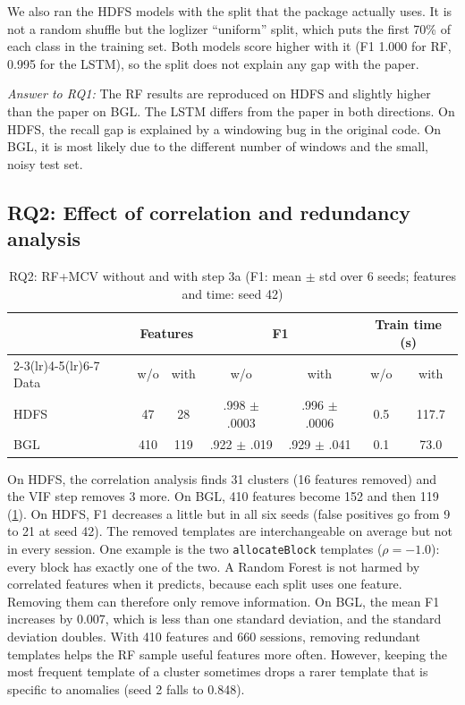 \documentclass[10pt, conference]{IEEEtran}
\newcommand{\tpl}[1]{\texttt{\small #1}}
\begin{document}
We also ran the HDFS models with the split that the package actually uses. It is not a random shuffle but the loglizer ``uniform'' split, which puts the first 70\% of each class in the training set. Both models score higher with it (F1 1.000 for RF, 0.995 for the LSTM), so the split does not explain any gap with the paper.

\textit{Answer to RQ1:} The RF results are reproduced on HDFS and slightly higher than the paper on BGL. The LSTM differs from the paper in both directions. On HDFS, the recall gap is explained by a windowing bug in the original code. On BGL, it is most likely due to the different number of windows and the small, noisy test set.

\subsection{RQ2: Effect of correlation and redundancy analysis}

\begin{table}[t]
\centering
\caption{RQ2: RF+MCV without and with step 3a (F1: mean $\pm$ std over 6 seeds; features and time: seed 42)}
\label{tab:rq2}
\footnotesize
\setlength{\tabcolsep}{3pt}
\begin{tabular}{lcccccc}
\toprule
 & \multicolumn{2}{c}{Features} & \multicolumn{2}{c}{F1} & \multicolumn{2}{c}{Train time (s)} \\
\cmidrule(lr){2-3}\cmidrule(lr){4-5}\cmidrule(lr){6-7}
Data & w/o & with & w/o & with & w/o & with \\
\midrule
HDFS & 47 & 28 & .998 $\pm$ .0003 & .996 $\pm$ .0006 & 0.5 & 117.7 \\
BGL & 410 & 119 & .922 $\pm$ .019 & .929 $\pm$ .041 & 0.1 & 73.0 \\
\bottomrule
\end{tabular}
\end{table}

On HDFS, the correlation analysis finds 31 clusters (16 features removed) and the VIF step removes 3 more. On BGL, 410 features become 152 and then 119 (\cref{tab:rq2}). On HDFS, F1 decreases a little but in all six seeds (false positives go from 9 to 21 at seed 42). The removed templates are interchangeable on average but not in every session. One example is the two \tpl{allocateBlock} templates ($\rho=-1.0$): every block has exactly one of the two. A Random Forest is not harmed by correlated features when it predicts, because each split uses one feature. Removing them can therefore only remove information. On BGL, the mean F1 increases by 0.007, which is less than one standard deviation, and the standard deviation doubles. With 410 features and 660 sessions, removing redundant templates helps the RF sample useful features more often. However, keeping the most frequent template of a cluster sometimes drops a rarer template that is specific to anomalies (seed 2 falls to 0.848).
\end{document}
